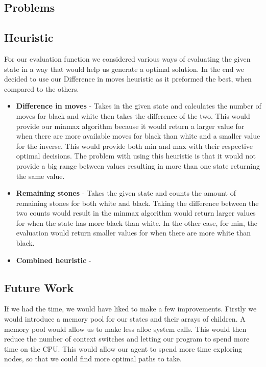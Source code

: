 \documentclass[12pt]{article}
\begin{document}

\subsection*{Problems}

\subsection*{Heuristic}
For our evaluation function we considered various ways of evaluating the given state in a way that would help us generate a optimal solution.
In the end we decided to use our Difference in moves heuristic as it preformed the best, when compared to the others.

\begin{itemize}
\item \textbf{Difference in moves} -
Takes in the given state and calculates the number of moves for black and white then takes the difference of the two. 
This would provide our minmax algorithm because it would return a larger value for when there are more available moves for black than white and a smaller value for the inverse.
This would provide both min and max with their respective optimal decisions.
The problem with using this heuristic is that it would not provide a big range between values resulting in more than one state returning the same value.

\item \textbf{Remaining stones} -
Takes the given state and counts the amount of remaining stones for both white and black.
Taking the difference between the two counts would result in the minmax algorithm would return larger values for when the state has more black than white.
In the other case, for min, the evaluation would return smaller values for when there are more white than black.

\item \textbf{Combined heuristic} - 

\end{itemize}

\subsection*{Future Work}
If we had the time, we would have liked to make a few improvements.
Firstly we would introduce a memory pool for our states and their arrays of children.
A memory pool would allow us to make less alloc system calls.
This would then reduce the number of context switches and letting our program to spend more time on the CPU.
This would allow our agent to spend more time exploring nodes, so that we could find more optimal paths to take.
\end{document}
